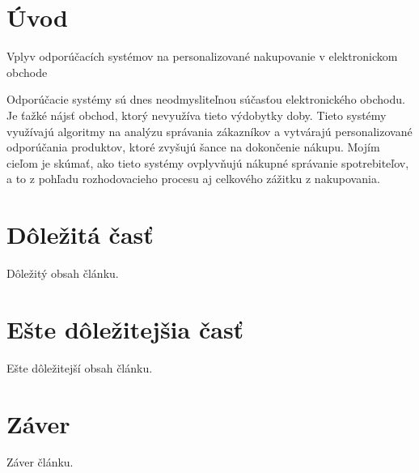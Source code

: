 \documentclass[10pt,slovak,a4paper]{article}
\author{
\begin{minipage}[t]{0.85\textwidth}
    \vspace{-2ex}
    Roman Dunko\\[2pt]
	{\small Slovenská technická univerzita v Bratislave}\\
	{\small Fakulta informatiky a informačných technológií}\\
	{\small \texttt{xdunko@stuba.sk}}
\end{minipage}
}
\date{\small 10. október 2024}
\begin{document}
\maketitle

\begin{abstract}
\ldots
\end{abstract}

\section{Úvod}
Vplyv odporúčacích systémov na personalizované nakupovanie v elektronickom obchode \cite{PLP-Framework}

Odporúčacie systémy sú dnes neodmysliteľnou súčasťou elektronického obchodu. Je ťažké nájsť obchod, ktorý nevyužíva tieto výdobytky doby. Tieto systémy využívajú algoritmy na analýzu správania zákazníkov a vytvárajú personalizované odporúčania produktov, ktoré zvyšujú šance na dokončenie nákupu. Mojím cieľom je skúmať, ako tieto systémy ovplyvňujú nákupné správanie spotrebiteľov, a to z pohľadu rozhodovacieho procesu aj celkového zážitku z nakupovania.



\section{Dôležitá časť} \label{dolezita}
Dôležitý obsah článku.

\section{Ešte dôležitejšia časť} \label{dolezitejsia}
Ešte dôležitejší obsah článku.

\section{Záver} \label{zaver}
Záver článku.

\end{document}
